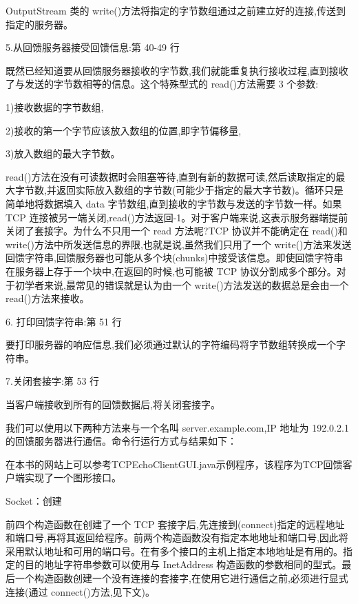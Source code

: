 		OutputStream 类的 write()方法将指定的字节数组通过之前建立好的连接,传送到指定的服务器。

		5.从回馈服务器接受回馈信息:第 40-49 行

		既然已经知道要从回馈服务器接收的字节数,我们就能重复执行接收过程,直到接收了与发送的字节数相等的信息。这个特殊型式的 read()方法需要 3 个参数:
		
		1)接收数据的字节数组,
		
		2)接收的第一个字节应该放入数组的位置,即字节偏移量,
		
		3)放入数组的最大字节数。
		
		read()方法在没有可读数据时会阻塞等待,直到有新的数据可读,然后读取指定的最大字节数,并返回实际放入数组的字节数(可能少于指定的最大字节数)。循环只是简单地将数据填入 data 字节数组,直到接收的字节数与发送的字节数一样。如果 TCP 连接被另一端关闭,read()方法返回-1。对于客户端来说,这表示服务器端提前关闭了套接字。为什么不只用一个 read 方法呢?TCP 协议并不能确定在 read()和 write()方法中所发送信息的界限,也就是说,虽然我们只用了一个 write()方法来发送回馈字符串,回馈服务器也可能从多个块(chunks)中接受该信息。即使回馈字符串在服务器上存于一个块中,在返回的时候,也可能被 TCP 协议分割成多个部分。对于初学者来说,最常见的错误就是认为由一个 write()方法发送的数据总是会由一个 read()方法来接收。

		6. 打印回馈字符串:第 51 行

		要打印服务器的响应信息,我们必须通过默认的字符编码将字节数组转换成一个字符串。

		7.关闭套接字:第 53 行

		当客户端接收到所有的回馈数据后,将关闭套接字。

		我们可以使用以下两种方法来与一个名叫 server.example.com,IP 地址为 192.0.2.1 的回馈服务器进行通信。命令行运行方式与结果如下：


		在本书的网站上可以参考TCPEchoClientGUI.java示例程序，该程序为TCP回馈客户端实现了一个图形接口。

		

		Socket：创建

		

		前四个构造函数在创建了一个 TCP 套接字后,先连接到(connect)指定的远程地址和端口号,再将其返回给程序。前两个构造函数没有指定本地地址和端口号,因此将采用默认地址和可用的端口号。在有多个接口的主机上指定本地地址是有用的。指定的目的地址字符串参数可以使用与 InetAddress 构造函数的参数相同的型式。最后一个构造函数创建一个没有连接的套接字,在使用它进行通信之前,必须进行显式连接(通过 connect()方法,见下文)。

